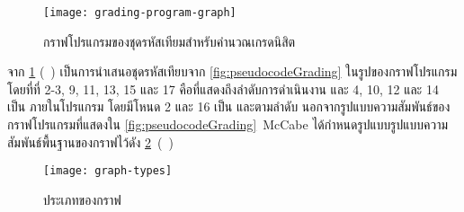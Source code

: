 \begin{figure}[hbt!]
    \centering
    \texttt{[image: grading-program-graph]}
    \caption{กราฟโปรแกรมของชุดรหัสเทียมสำหรับคำนวณเกรดนิสิต}
    \label{fig:programGraph}
\end{figure}

จาก{\figurename} \ref{fig:programGraph} (\pagename\ \pageref{fig:programGraph}) เป็นการนำเสนอชุดรหัสเทียบจาก{\figurename} 
\ref{fig:pseudocodeGrading} ในรูปของกราฟโปรแกรม โดยที่{\Node}ที่ 2-3, 9, 11, 13, 15 และ 17 คือ{\Node}ที่แสดงถึงลำดับการดำเนินงาน 
และ{\Node} 4, 10, 12 และ 14 เป็น{\FirstTimeDefine{\PredicateNode}{\PredicateNodeEN}} ภายในโปรแกรม 
โดยมีโหนด 2 และ 16 เป็น{\FirstTimeDefine{\sourcenode}{\sourcenodeEN}} และ{\FirstTimeDefine{\sinknode}{\sinknodeEN}}ตามลำดับ 
นอกจากรูปแบบความสัมพันธ์ของกราฟโปรแกรมที่แสดงใน{\figurename} \ref{fig:pseudocodeGrading}\ McCabe \cite{Watson1996} 
ได้กำหนดรูปแบบรูปแบบความสัมพันธ์พื้นฐานของกราฟไว้ดัง{\figurename} \ref{fig:graphtype}\ (\pagename\ \pageref{fig:graphtype})

\begin{figure}[ht!]
    \centering
    \texttt{[image: graph-types]}
    \caption{ประเภทของกราฟ}
    \label{fig:graphtype}
\end{figure}


